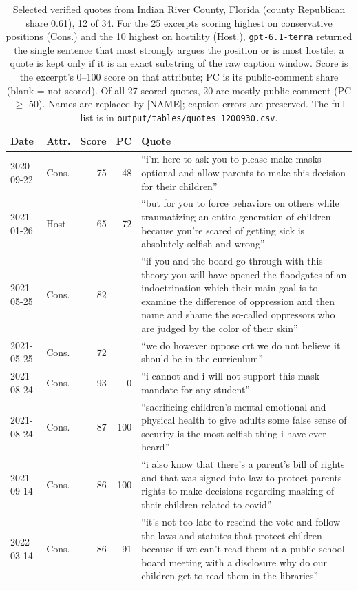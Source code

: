\begin{table}[H]
\centering
\small
\caption{Selected verified quotes from Indian River County, Florida (county Republican share 0.61), 12 of 34. For the 25 excerpts scoring highest on conservative positions (Cons.) and the 10 highest on hostility (Host.), \texttt{gpt-6.1-terra} returned the single sentence that most strongly argues the position or is most hostile; a quote is kept only if it is an exact substring of the raw caption window. Score is the excerpt's 0--100 score on that attribute; PC is its public-comment share (blank = not scored). Of all 27 scored quotes, 20 are mostly public comment (PC $\geq$ 50). Names are replaced by [NAME]; caption errors are preserved. The full list is in \texttt{output/tables/quotes\_1200930.csv}.}
\label{tab:quotes}
\begin{tabularx}{\linewidth}{@{}l l r r X@{}}
\toprule
Date & Attr. & Score & PC & Quote \\
\midrule
2020-09-22 & Cons. & 75 & 48 & ``i'm here to ask you to please make masks optional and allow parents to make this decision for their children'' \\[2pt]
2021-01-26 & Host. & 65 & 72 & ``but for you to force behaviors on others while traumatizing an entire generation of children because you're scared of getting sick is absolutely selfish and wrong'' \\[2pt]
2021-05-25 & Cons. & 82 &  & ``if you and the board go through with this theory you will have opened the floodgates of an indoctrination which their main goal is to examine the difference of oppression and then name and shame the so-called oppressors who are judged by the color of their skin'' \\[2pt]
2021-05-25 & Cons. & 72 &  & ``we do however oppose crt we do not believe it should be in the curriculum'' \\[2pt]
2021-08-24 & Cons. & 93 & 0 & ``i cannot and i will not support this mask mandate for any student'' \\[2pt]
2021-08-24 & Cons. & 87 & 100 & ``sacrificing children's mental emotional and physical health to give adults some false sense of security is the most selfish thing i have ever heard'' \\[2pt]
2021-09-14 & Cons. & 86 & 100 & ``i also know that there's a parent's bill of rights and that was signed into law to protect parents rights to make decisions regarding masking of their children related to covid'' \\[2pt]
2022-03-14 & Cons. & 86 & 91 & ``it's not too late to rescind the vote and follow the laws and statutes that protect children because if we can't read them at a public school board meeting with a disclosure why do our children get to read them in the libraries'' \\[2pt]

\end{tabularx}
\end{table}
